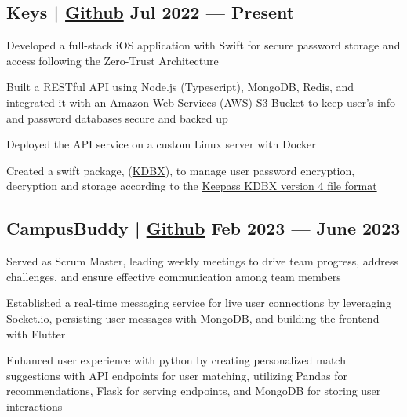 \subsection{{Keys | \href{https://github.com/jerikjakobsen/keys}{Github} \hfill Jul 2022 --- Present}}
\begin{zitemize}
\item Developed a full-stack iOS application with Swift for secure password storage and access following the Zero-Trust Architecture
\item Built a RESTful API using Node.js (Typescript), MongoDB, Redis, and integrated it with an Amazon Web Services (AWS) S3 Bucket to keep user's info and password databases secure and backed up
\item Deployed the API service on a custom Linux server with Docker
\item Created a swift package, (\href{https://github.com/jerikjakobsen/kdbx}{KDBX}), to manage user password encryption, decryption and storage according to the  \href{https://keepass.info/help/kb/kdbx_4.html}{Keepass KDBX version 4 file format}
\end{zitemize}

\subsection{{CampusBuddy | \href{https://github.com/pegliang/CampusBuddy}{Github} \hfill Feb 2023 --- June 2023}}
\begin{zitemize}
\item Served as Scrum Master, leading weekly meetings to drive team progress, address challenges, and ensure effective communication among team members
\item Established a real-time messaging service for live user connections by leveraging Socket.io, persisting user messages with MongoDB, and building the frontend with Flutter
\item Enhanced user experience with python by creating personalized match suggestions with API endpoints for user matching, utilizing Pandas for recommendations, Flask for serving endpoints, and MongoDB for storing user interactions
\end{zitemize}

